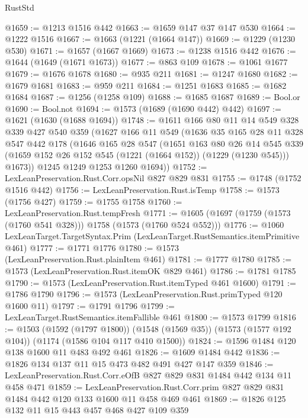 \begin{lexlean}{RustStd}
\begin{coremodule}
@1659 := @1213 @1516 @442
@1663 := @1659 @147 @37 @147 @530
@1664 := @1222 @1516
@1667 := @1663 (@1221 (@1664 @147))
@1669 := @1229 (@1230 @530)
@1671 := @1657 (@1667 @1669)
@1673 := @1238 @1516 @442
@1676 := @1644 (@1649 (@1671 @1673))
@1677 := @863 @109
@1678 := @1061 @1677
@1679 := @1676 @1678
@1680 := @935 @211
@1681 := @1247 @1680
@1682 := @1679 @1681
@1683 := @959 @211
@1684 := @1251 @1683
@1685 := @1682 @1684
@1687 := @1256 (@1258 @109)
@1688 := @1685 @1687
@1689 := Bool.or
@1690 := Bool.not
@1694 := @1573 (@1689 (@1690 @442) @442)
@1697 := @1621 (@1630 (@1688 @1694))
@1748 := @1611
    @166
    @80
    @11
    @14
    @549
    @328
    @339
    @427
    @540
    @359
    (@1627
      @166
      @11
      @549
      (@1636
        @35
        @165
        @28
        @11
        @328
        @547
        @442
        @178
        (@1646
          @165
          @28
          @547
          (@1651
            @163
            @80
            @26
            @14
            @545
            @339
            (@1659 @152 @26 @152 @545 (@1221 (@1664 @152)) (@1229 (@1230 @545)))
            @1673))
        @1245
        @1249
        @1253
        @1260
        @1694))
@1752 := LexLeanPreservation.Rust.Corr.opsNil @827 @829 @831
@1755 := @1748 (@1752 @1516 @442)
@1756 := LexLeanPreservation.Rust.isTemp
@1758 := @1573 (@1756 @427)
@1759 := @1755 @1758
@1760 := LexLeanPreservation.Rust.tempFresh
@1771 := @1605 (@1697 (@1759 (@1573 (@1760 @541 @328))) @1758 (@1573 (@1760 @524 @552)))
@1776 := @1060 LexLeanTarget.TargetSyntax.Prim (LexLeanTarget.RustSemantics.itemPrimitive @461)
@1777 := @1771 @1776
@1780 := @1573 (LexLeanPreservation.Rust.plainItem @461)
@1781 := @1777 @1780
@1785 := @1573 (LexLeanPreservation.Rust.itemOK @829 @461)
@1786 := @1781 @1785
@1790 := @1573 (LexLeanPreservation.Rust.itemTyped @461 @1600)
@1791 := @1786 @1790
@1796 := @1573 (LexLeanPreservation.Rust.primTyped @120 @1600 @11)
@1797 := @1791 @1796
@1799 := LexLeanTarget.RustSemantics.itemFallible @461
@1800 := @1573 @1799
@1816 := @1503
    (@1592 (@1797 @1800))
    (@1548 (@1569 @35))
    (@1573 (@1577 @192 @104))
    (@1174 (@1586 @104 @117 @410 @1500))
@1824 := @1596 @1484 @120 @138 @1600 @11 @483 @492 @461
@1826 := @1609 @1484 @442
@1836 := @1826 @134 @137 @11 @15 @473 @482 @491 @427 @147 @359
@1846 := LexLeanPreservation.Rust.Corr.eOfB @827 @829 @831 @1484 @442 @134 @11 @458 @471
@1859 := LexLeanPreservation.Rust.Corr.prim
    @827
    @829
    @831
    @1484
    @442
    @120
    @133
    @1600
    @11
    @458
    @469
    @461
@1869 := @1826 @125 @132 @11 @15 @443 @457 @468 @427 @109 @359

\end{coremodule}
\end{lexlean}
